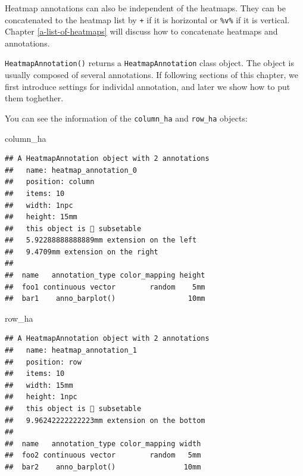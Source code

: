 \documentclass[]{book}
\newenvironment{Shaded}{\begin{snugshade}}{\end{snugshade}}
\newcommand{\KeywordTok}[1]{\textcolor[rgb]{0.13,0.29,0.53}{\textbf{#1}}}
\newcommand{\StringTok}[1]{\textcolor[rgb]{0.31,0.60,0.02}{#1}}
\newcommand{\CommentTok}[1]{\textcolor[rgb]{0.56,0.35,0.01}{\textit{#1}}}
\newcommand{\OperatorTok}[1]{\textcolor[rgb]{0.81,0.36,0.00}{\textbf{#1}}}
\newcommand{\NormalTok}[1]{#1}
\theoremstyle{definition}
\theoremstyle{definition}
\theoremstyle{definition}
\theoremstyle{remark}
\begin{document}
Heatmap annotations can also be independent of the heatmaps. They can be
concatenated to the heatmap list by \texttt{+} if it is horizontal or
\texttt{\%v\%} if it is vertical. Chapter \ref{a-list-of-heatmaps} will
discuss how to concatenate heatmaps and annotations.

\begin{Shaded}
\end{Shaded}

\texttt{HeatmapAnnotation()} returns a \texttt{HeatmapAnnotation} class
object. The object is usually composed of several annotations. If
following sections of this chapter, we first introduce settings for
individal annotation, and later we show how to put them toghether.

You can see the information of the \texttt{column\_ha} and
\texttt{row\_ha} objects:

\begin{Shaded}
\begin{Highlighting}[]
\NormalTok{column_ha}
\end{Highlighting}
\end{Shaded}

\begin{verbatim}
## A HeatmapAnnotation object with 2 annotations
##   name: heatmap_annotation_0 
##   position: column 
##   items: 10 
##   width: 1npc 
##   height: 15mm 
##   this object is  subsetable
##   5.92288888888889mm extension on the left 
##   9.4709mm extension on the right 
## 
##  name   annotation_type color_mapping height
##  foo1 continuous vector        random    5mm
##  bar1    anno_barplot()                 10mm
\end{verbatim}

\begin{Shaded}
\begin{Highlighting}[]
\NormalTok{row_ha}
\end{Highlighting}
\end{Shaded}

\begin{verbatim}
## A HeatmapAnnotation object with 2 annotations
##   name: heatmap_annotation_1 
##   position: row 
##   items: 10 
##   width: 15mm 
##   height: 1npc 
##   this object is  subsetable
##   9.96242222222223mm extension on the bottom 
## 
##  name   annotation_type color_mapping width
##  foo2 continuous vector        random   5mm
##  bar2    anno_barplot()                10mm
\end{verbatim}
\end{document}
